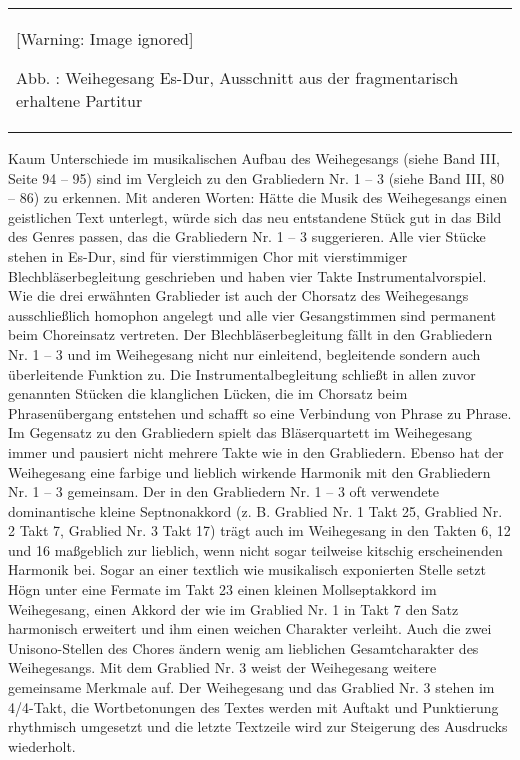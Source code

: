 \documentclass[a4paper]{article}
\newcounter{Abb}
\renewcommand\theAbb{\arabic{Abb}}
\begin{document}
\begin{center}
\begin{minipage}{6.969cm}
\begin{center}
\tablefirsthead{}
\tablehead{}
\tabletail{}
\tablelasttail{}
\begin{supertabular}{m{6.769cm}}
  [Warning: Image ignored] %
 
Abb. \stepcounter{Abb}{\theAbb}: Weihegesang Es-Dur, Ausschnitt aus der
fragmentarisch erhaltene Partitur\\
\end{supertabular}
\end{center}
\end{minipage}
\end{center}
Kaum Unterschiede im musikalischen Aufbau des Weihegesangs (siehe Band
III, Seite 94 – 95) sind im Vergleich zu den Grabliedern Nr. 1 – 3
(siehe Band III, 80 – 86) zu erkennen. Mit anderen Worten: Hätte die
Musik des Weihegesangs einen geistlichen Text unterlegt, würde sich das
neu entstandene Stück gut in das Bild des Genres passen, das die
Grabliedern Nr. 1 – 3 suggerieren. Alle vier Stücke stehen in Es-Dur,
sind für vierstimmigen Chor mit vierstimmiger Blechbläserbegleitung
geschrieben und haben vier Takte Instrumentalvorspiel. Wie die drei
erwähnten Grablieder ist auch der Chorsatz des Weihegesangs
ausschließlich homophon angelegt und alle vier Gesangstimmen sind
permanent beim Choreinsatz vertreten. Der Blechbläserbegleitung fällt
in den Grabliedern Nr. 1 – 3 und im Weihegesang nicht nur einleitend,
begleitende sondern auch überleitende Funktion zu. Die
Instrumentalbegleitung schließt in allen zuvor genannten Stücken die
klanglichen Lücken, die im Chorsatz beim Phrasenübergang entstehen und
schafft so eine Verbindung von Phrase zu Phrase. Im Gegensatz zu den
Grabliedern spielt das Bläserquartett im Weihegesang immer und pausiert
nicht mehrere Takte wie in den Grabliedern. \newline
Ebenso hat der Weihegesang eine farbige und lieblich wirkende Harmonik
mit den Grabliedern Nr. 1 – 3 gemeinsam. Der in den Grabliedern Nr. 1 –
3 oft verwendete dominantische kleine Septnonakkord (z. B. Grablied Nr.
1 Takt 25, Grablied Nr. 2 Takt 7, Grablied Nr. 3 Takt 17) trägt auch im
Weihegesang in den Takten 6, 12 und 16 maßgeblich zur lieblich, wenn
nicht sogar teilweise kitschig erscheinenden Harmonik bei. Sogar an
einer textlich wie musikalisch exponierten Stelle setzt Högn unter eine
Fermate im Takt 23 einen kleinen Mollseptakkord im Weihegesang, einen
Akkord der wie im Grablied Nr. 1 in Takt 7 den Satz harmonisch
erweitert und ihm einen weichen Charakter verleiht. Auch die zwei
Unisono-Stellen des Chores ändern wenig am lieblichen Gesamtcharakter
des Weihegesangs. Mit dem Grablied Nr. 3 weist der Weihegesang weitere
gemeinsame Merkmale auf. Der Weihegesang und das Grablied Nr. 3 stehen
im 4/4-Takt, die Wortbetonungen des Textes werden mit Auftakt und
Punktierung rhythmisch umgesetzt und die letzte Textzeile wird zur
Steigerung des Ausdrucks wiederholt. 
\end{document}
